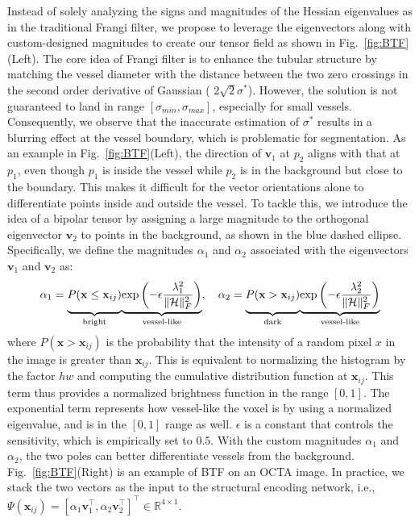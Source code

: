 \documentclass[runningheads]{llncs}
\begin{document}
Instead of solely analyzing the signs and magnitudes of the Hessian eigenvalues as in the traditional Frangi filter, we propose to leverage the eigenvectors along with custom-designed magnitudes to create our tensor field as shown in Fig.\ \ref{fig:BTF}(Left). The core idea of Frangi filter is to enhance the tubular structure by matching the vessel diameter with the distance between the two zero crossings in the second order derivative of Gaussian ( $2\sqrt{2}\sigma^*$). However, the solution is not guaranteed to land in range $[\sigma_{min},\sigma_{max}]$, especially for small vessels. Consequently, we observe that the inaccurate estimation of $\sigma^*$ results in a blurring effect at the vessel boundary, which is problematic for segmentation. As an example in Fig.~\ref{fig:BTF}(Left), the direction of $\mathbf{v}_1$ at $p_2$ aligns with that at $p_1$, even though $p_1$ is inside the vessel while $p_2$ is in the background but close to the boundary. This makes it difficult for the vector orientations alone to differentiate points inside and outside the vessel. To tackle this, we introduce the idea of a bipolar tensor by assigning a large magnitude to the orthogonal eigenvector $\mathbf{v}_2$ to points in the background, as shown in the blue dashed ellipse. Specifically, we define the magnitudes $\alpha_1$ and $\alpha_2$ associated with the eigenvectors $\mathbf{v}_1$ and $\mathbf{v}_2$ as:
\begin{align}
    \alpha_1 = 
    {\underbrace{%
     \vphantom{ \left(\frac{\lambda_1^2}{\|\mathcal{H}\|^2_{F}}\right) } 
     P(\mathbf{x}\leq \mathbf{x}_{ij})}_{\text{bright}}}
    {\underbrace{%
     \exp\left(-\epsilon\frac{\lambda_1^2}{\|\mathcal{H}\|^2_{F}}\right) 
    }_{\text{vessel-like}}} 
    ,\quad 
    \alpha_2 = 
    {\underbrace{%
     \vphantom{ \left(\frac{\lambda_2^2}{\|\mathcal{H}\|^2_{F}}\right) } 
     P(\mathbf{x}> \mathbf{x}_{ij})}_{\text{dark}}}
    {\underbrace{%
     \exp\left(-\epsilon\frac{\lambda_2^2}{\|\mathcal{H}\|^2_{F}}\right) 
    }_{\text{vessel-like}}}
\end{align}
where $P(\mathbf{x} > \mathbf{x}_{ij})$ is the probability that the intensity of a random pixel $x$ in the image is greater than $\mathbf{x}_{ij}$. This is equivalent to normalizing the histogram by the factor $hw$ and computing the cumulative distribution function at $\mathbf{x}_{ij}$. This term thus provides a normalized brightness function in the range $[0,1]$. The exponential term represents how vessel-like the voxel is by using a normalized eigenvalue, and is in the $[0,1]$ range as well. $\epsilon$ is a constant that controls the sensitivity, which is empirically set to $0.5$. With the custom magnitudes $\alpha_1$ and $\alpha_2$, the two poles can better differentiate vessels from the background. Fig.~\ref{fig:BTF}(Right) is an example of BTF on an OCTA image. In practice, we stack the two vectors as the input to the structural encoding network, i.e., $\Psi(\mathbf{x}_{ij})=\left[\alpha_1\mathbf{v}_1^\top,\alpha_2\mathbf{v}_2^\top\right]^\top \in \mathbb{R}^{4\times 1}$. 
\end{document}
